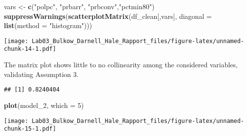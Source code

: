 \documentclass[]{article}
\newenvironment{Shaded}{\begin{snugshade}}{\end{snugshade}}
\newcommand{\KeywordTok}[1]{\textcolor[rgb]{0.13,0.29,0.53}{\textbf{#1}}}
\newcommand{\DataTypeTok}[1]{\textcolor[rgb]{0.13,0.29,0.53}{#1}}
\newcommand{\DecValTok}[1]{\textcolor[rgb]{0.00,0.00,0.81}{#1}}
\newcommand{\StringTok}[1]{\textcolor[rgb]{0.31,0.60,0.02}{#1}}
\newcommand{\CommentTok}[1]{\textcolor[rgb]{0.56,0.35,0.01}{\textit{#1}}}
\newcommand{\OperatorTok}[1]{\textcolor[rgb]{0.81,0.36,0.00}{\textbf{#1}}}
\newcommand{\NormalTok}[1]{#1}
\begin{document}
\begin{Shaded}
\begin{Highlighting}[]
\NormalTok{vars <-}\StringTok{ }\KeywordTok{c}\NormalTok{(}\StringTok{"polpc"}\NormalTok{, }\StringTok{"prbarr"}\NormalTok{, }\StringTok{"prbconv"}\NormalTok{,}\StringTok{"pctmin80"}\NormalTok{)}
\KeywordTok{suppressWarnings}\NormalTok{(}\KeywordTok{scatterplotMatrix}\NormalTok{(df_clean[,vars], }
                                   \DataTypeTok{diagonal =} \KeywordTok{list}\NormalTok{(}\DataTypeTok{method =} \StringTok{"histogram"}\NormalTok{)))}
\end{Highlighting}
\end{Shaded}

\texttt{[image: Lab03\_Bulkow\_Darnell\_Hale\_Rapport\_files/figure-latex/unnamed-chunk-14-1.pdf]}

The matrix plot shows little to no collinearity among the considered
variables, validating Assumption 3.

\begin{Shaded}
\end{Shaded}

\begin{verbatim}
## [1] 0.8240404
\end{verbatim}

\begin{Shaded}
\begin{Highlighting}[]
\KeywordTok{plot}\NormalTok{(model_}\DecValTok{2}\NormalTok{, }\DataTypeTok{which =} \DecValTok{5}\NormalTok{)}
\end{Highlighting}
\end{Shaded}

\texttt{[image: Lab03\_Bulkow\_Darnell\_Hale\_Rapport\_files/figure-latex/unnamed-chunk-15-1.pdf]}
\end{document}
